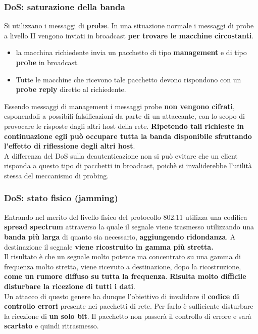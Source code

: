 \documentclass[12pt]{article}
\begin{document}
			\subsubsection{DoS: saturazione della banda}
				Si utilizzano i messaggi di \textbf{probe}. In una situazione normale i messaggi di probe a livello II vengono inviati in broadcast \textbf{per trovare le macchine circostanti}. 
				\begin{itemize}
					\item la macchina richiedente invia un pacchetto di tipo \textbf{management} e di tipo \textbf{probe} in broadcast.
					\item Tutte le macchine che ricevono tale pacchetto devono rispondono con un \textbf{probe reply} diretto al richiedente.
				\end{itemize}
				Essendo messaggi di management i messaggi probe \textbf{non vengono cifrati}, esponendoli a possibili falsificazioni da parte di un attaccante, con lo scopo di provocare le risposte dagli altri host della rete. \textbf{Ripetendo tali richieste in continuazione egli può occupare tutta la banda disponibile sfruttando l'effetto di riflessione degli altri host}.\\
				A differenza del DoS sulla deautenticazione non si può evitare che un client risponda a questo tipo di pacchetti in broadcast, poichè si invaliderebbe l'utilità stessa del meccanismo di probing.
				
			\subsubsection{DoS: stato fisico (jamming)}
				Entrando nel merito del livello fisico del protocollo 802.11 utilizza una codifica \textbf{spread spectrum} attraverso la quale il segnale viene trasmesso utilizzando una \textbf{banda più larga} di quanto sia necessario, \textbf{aggiungendo ridondanza}. A destinazione il segnale \textbf{viene ricostruito in gamma più stretta.}\\
				Il risultato è che un segnale molto potente ma concentrato su una gamma di frequenza molto stretta, viene ricevuto a destinazione, dopo la ricostruzione, \textbf{come un rumore diffuso su tutta la frequenza}.	 \textbf{Risulta molto difficile disturbare la ricezione di tutti i dati}. \\
				Un attacco di questo genere ha dunque l'obiettivo di invalidare il \textbf{codice di controllo errori} presente nei pacchetti di rete. Per farlo è sufficiente disturbare la ricezione di \textbf{un solo bit}. Il pacchetto non passerà il controllo di errore e sarà \textbf{scartato} e quindi ritrasmesso.
\end{document}
